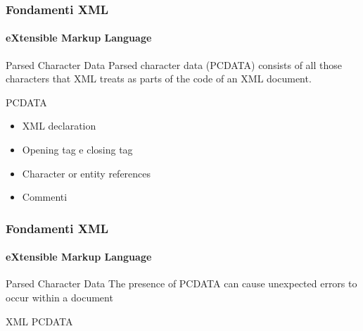 \begin{frame}
    \frametitle{Fondamenti XML}
    \framesubtitle{eXtensible Markup Language}
    \addtocounter{nframe}{1}

	\begin{block}{Parsed Character Data}
		Parsed character data (PCDATA) consists of all those characters that XML treats as parts of the code of an XML document.
	\end{block}

	\begin{block}{PCDATA}
		\begin{itemize}
			\item XML declaration
			\item Opening tag e  closing tag
			\item Character or entity references
			\item Commenti
		\end{itemize}
	\end{block}

\end{frame}


\begin{frame}
    \frametitle{Fondamenti XML}
    \framesubtitle{eXtensible Markup Language}
    \addtocounter{nframe}{1}

	\begin{block}{Parsed Character Data}
		The presence of PCDATA can cause unexpected errors to occur within a document
	\end{block}

	\begin{block}{XML PCDATA}
	\end{block}

\end{frame}



